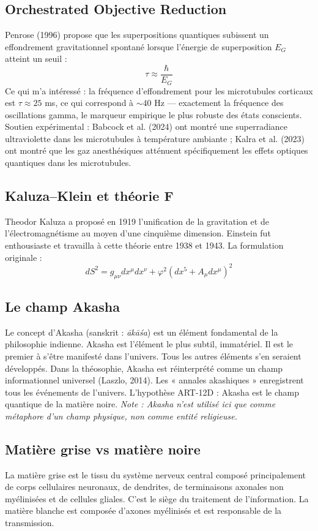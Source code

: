 \subsection{Orchestrated Objective Reduction}
Penrose (1996) propose que les superpositions quantiques subissent un effondrement gravitationnel spontané lorsque l'énergie de superposition $E_G$ atteint un seuil :
\begin{equation}
\tau \approx \frac{\hbar}{E_G}
\end{equation}
Ce qui m'a intéressé : la fréquence d'effondrement pour les microtubules corticaux est $\tau \approx 25$ ms, ce qui correspond à $\sim 40$ Hz --- exactement la fréquence des oscillations gamma, le marqueur empirique le plus robuste des états conscients. Soutien expérimental : Babcock et al. (2024) ont montré une superradiance ultraviolette dans les microtubules à température ambiante ; Kalra et al. (2023) ont montré que les gaz anesthésiques atténuent spécifiquement les effets optiques quantiques dans les microtubules.

\subsection{Kaluza--Klein et théorie F}
Theodor Kaluza a proposé en 1919 l'unification de la gravitation et de l'électromagnétisme au moyen d'une cinquième dimension. Einstein fut enthousiaste et travailla à cette théorie entre 1938 et 1943. La formulation originale :
\begin{equation}
dS^2 = g_{\mu\nu} dx^\mu dx^\nu + \varphi^2(dx^5 + A_{\mu} dx^\mu)^2
\end{equation}

\subsection{Le champ Akasha}
Le concept d'Akasha (sanskrit : \emph{ākāśa}) est un élément fondamental de la philosophie indienne. Akasha est l'élément le plus subtil, immatériel. Il est le premier à s'être manifesté dans l'univers. Tous les autres éléments s'en seraient développés. Dans la théosophie, Akasha est réinterprété comme un champ informationnel universel (Laszlo, 2014). Les « annales akashiques » enregistrent tous les événements de l'univers. L'hypothèse ART-12D : Akasha est le champ quantique de la matière noire. \textit{Note : Akasha n'est utilisé ici que comme métaphore d'un champ physique, non comme entité religieuse.}

\subsection{Matière grise vs matière noire}
La matière grise est le tissu du système nerveux central composé principalement de corps cellulaires neuronaux, de dendrites, de terminaisons axonales non myélinisées et de cellules gliales. C'est le siège du traitement de l'information. La matière blanche est composée d'axones myélinisés et est responsable de la transmission.

